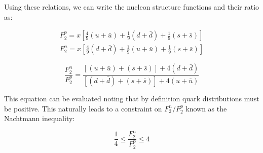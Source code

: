 Using these relations, we can write the nucleon structure functions and their ratio as:

\begin{subequations}
\begin{align}
	F_2^p = x\left[\frac{4}{9}\left(u+\bar{u}\right) + \frac{1}{9}\left(d+\bar{d}\right) + \frac{1}{9}\left(s+\bar{s}\right)\right] \\
	F_2^n = x\left[\frac{4}{9}\left(d+\bar{d}\right) + \frac{1}{9}\left(u+\bar{u}\right) + \frac{1}{9}\left(s+\bar{s}\right)\right]
\end{align}
\end{subequations}

\begin{equation}
	\frac{F_2^n}{F_2^p} = \frac{\left[\left(u+\bar{u}\right) + \left(s+\bar{s}\right)\right] + 4\left(d+\bar{d}\right)}{\left[\left(d+\bar{d}\right) + \left(s+\bar{s}\right)\right] + 4\left(u+\bar{u}\right)}
\end{equation}

This equation can be evaluated noting that by definition quark distributions must be positive. This naturally leads to a constraint on $F_2^n/F_2^p$ known as the Nachtmann inequality:

\begin{equation}
	\frac{1}{4} \leq \frac{F_2^n}{F_2^p} \leq 4
\end{equation}


%
%
%
%
%
%
